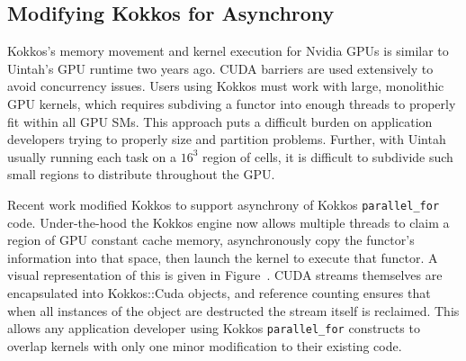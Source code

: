 \documentclass[12pt]{article}
\begin{document}



\subsection{Modifying Kokkos for Asynchrony}
\label{ch:kokkos_modifications}
Kokkos's memory movement and kernel execution for Nvidia GPUs is similar to Uintah's GPU runtime two years ago.  CUDA barriers are used extensively to avoid concurrency issues.  Users using Kokkos must work with large, monolithic GPU kernels, which requires subdiving a functor into enough threads to properly fit within all GPU SMs.  This approach puts a difficult burden on application developers trying to properly size and partition problems.  Further, with Uintah usually running each task on a $16^3$ region of cells, it is difficult to subdivide such small regions to distribute throughout the GPU.  

Recent work modified Kokkos to support asynchrony of Kokkos \texttt{parallel\_for} code.  Under-the-hood the Kokkos engine now allows multiple threads to claim a region of GPU constant cache memory, asynchronously copy the functor's information into that space, then launch the kernel to execute that functor.  A visual representation of this is given in Figure~\cite{fig:kokkos-constant-cache-new}.  CUDA streams themselves are encapsulated into Kokkos::Cuda objects, and reference counting ensures that when all instances of the object are destructed the stream itself is reclaimed.  This allows any application developer using Kokkos \texttt{parallel\_for} constructs to overlap kernels with only one minor modification to their existing code. 
\end{document}
